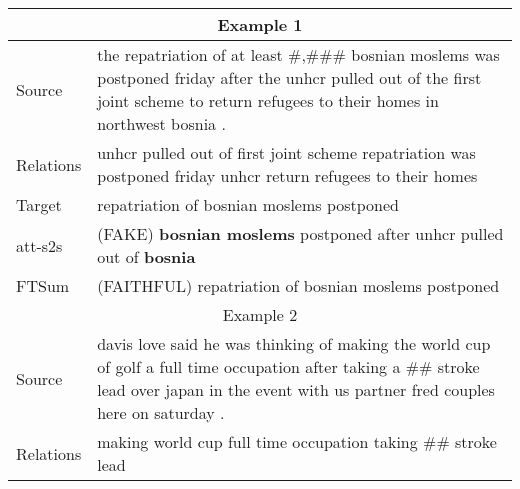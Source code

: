 \documentclass[letterpaper]{article} \usepackage{aaai18}  \usepackage{times}  \usepackage{helvet}  \usepackage{courier}  \usepackage{url}  \usepackage{graphicx}  \usepackage{amsfonts}
\begin{document}
	
	\begin{table*}[ht]
		\centering
		\begin{tabularx}{\linewidth}{p{1.2cm}|X}
			\hline
			\multicolumn{2}{c}{Example 1}                                                                                                                                                                                              \\ \hline
			\multicolumn{1}{l|}{Source}    & the repatriation of at least \#,\#\#\# bosnian moslems was postponed friday after the unhcr pulled out of the first joint scheme to return refugees to their homes in northwest bosnia .                      \\ \hline
			\multicolumn{1}{l|}{Relations} & unhcr pulled out of first joint scheme  repatriation was postponed friday  unhcr return refugees to their homes                                                                            \\ \hline
			\multicolumn{1}{l|}{Target}    & repatriation of bosnian moslems postponed                                                                                                                              \\ \hline
			\multicolumn{1}{l|}{att-s2s}   & (FAKE) \textbf{bosnian moslems} postponed after unhcr pulled out of \textbf{bosnia}                                                                                                                \\ \hline
			\multicolumn{1}{l|}{FTSum}     & (FAITHFUL) repatriation of bosnian moslems postponed                                                                                                               \\ \hline
\multicolumn{2}{c}{Example 2}                                                                                                                                                                                              \\ \hline
			\multicolumn{1}{l|}{Source}    & davis love said he was thinking of making the world cup of golf a full time occupation after taking a \#\# stroke lead over japan in the event with us partner fred couples here on saturday .                                                    \\ \hline
			\multicolumn{1}{l|}{Relations} & making world cup full time occupation  taking \#\# stroke lead                                                                                                                       \\ \hline

\end{tabularx}
\end{table*}
\end{document}
